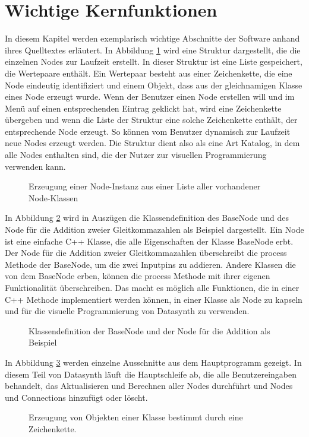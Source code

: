 \documentclass[a4paper, 
               12pt,
               DIV=calc,
               version=first,
               pdftex,
               headsepline,
               footsepline,
               bibtotocnumbered,
               liststotocnumbered]{scrreprt}
\begin{document}
\section{Wichtige Kernfunktionen}
\label{sec:Kernfunktionen}
In diesem Kapitel werden exemplarisch wichtige Abschnitte der Software anhand ihres Quelltextes
erläutert.
In Abbildung \ref{fig:factory} wird eine Struktur dargestellt, die die einzelnen
Nodes zur Laufzeit erstellt. In dieser Struktur ist eine Liste gespeichert, die Wertepaare
enthält. Ein Wertepaar besteht aus einer Zeichenkette, die eine Node eindeutig identifiziert
und einem Objekt, dass aus der gleichnamigen Klasse eines Node erzeugt wurde.
Wenn der Benutzer einen Node erstellen will und im Menü auf einen entsprechenden Eintrag geklickt hat,
wird eine Zeichenkette übergeben und wenn die Liste der Struktur eine solche Zeichenkette enthält, der
entsprechende Node erzeugt. So können vom Benutzer dynamisch zur Laufzeit
neue Nodes erzeugt werden. Die Struktur dient also als eine Art Katalog, in dem alle
Nodes enthalten sind, die der Nutzer zur visuellen Programmierung verwenden kann.
\begin{figure}
\centering

\caption{Erzeugung einer Node-Instanz aus einer Liste aller vorhandener Node-Klassen}
\label{fig:factory}
\end{figure}
In Abbildung \ref{fig:node} wird in Auszügen die Klassendefinition des BaseNode und
des Node für die Addition zweier Gleitkommazahlen als Beispiel dargestellt.
Ein Node ist eine einfache C++ Klasse, die alle Eigenschaften der Klasse BaseNode erbt.
Der Node für die Addition zweier Gleitkommazahlen überschreibt die process Methode der BaseNode, um die zwei
Inputpins zu addieren. Andere Klassen die von dem BaseNode erben, können die process
Methode mit ihrer eigenen Funktionalität überschreiben.
Das macht es möglich alle Funktionen, die in einer C++ Methode implementiert werden können,
in einer Klasse als Node zu kapseln und für die visuelle Programmierung von Datasynth zu verwenden.
\begin{figure}
\centering

\caption{Klassendefinition der BaseNode und der Node für die Addition als Beispiel}
\label{fig:node}
\end{figure}
In Abbildung \ref{fig:core} werden einzelne Ausschnitte aus dem Hauptprogramm gezeigt.
In diesem Teil von Datasynth läuft die Hauptschleife ab, die alle Benutzereingaben behandelt,
das Aktualisieren und Berechnen aller Nodes durchführt und Nodes und Connections
hinzufügt oder löscht.
\begin{figure}
\centering

\caption{Erzeugung von Objekten einer Klasse bestimmt durch eine Zeichenkette.}
\label{fig:core}
\end{figure}
\end{document}
